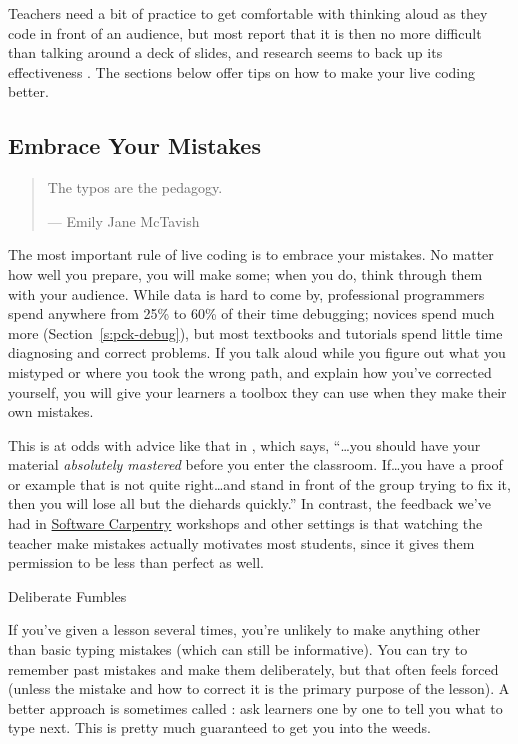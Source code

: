 Teachers need a bit of practice to get comfortable with thinking aloud
as they code in front of an audience, but most report that it is then no
more difficult than talking around a deck of slides, and research seems
to back up its effectiveness \cite{Rubi2013,Haar2017}. The sections
below offer tips on how to make your live coding better.

\subsection*{Embrace Your Mistakes}

\begin{quote}
The typos are the pedagogy.

--- Emily Jane McTavish
\end{quote}

The most important rule of live coding is to embrace your mistakes. No
matter how well you prepare, you will make some; when you do, think
through them with your audience. While data is hard to come by,
professional programmers spend anywhere from 25\% to 60\% of their time
debugging; novices spend much more (Section~\ref{s:pck-debug}), but most
textbooks and tutorials spend little time diagnosing and correct
problems. If you talk aloud while you figure out what you mistyped or
where you took the wrong path, and explain how you've corrected
yourself, you will give your learners a toolbox they can use when they
make their own mistakes.

This is at odds with advice like that in \cite{Kran2015}, which
says, ``\ldots{}you should have your material \emph{absolutely mastered} before
you enter the classroom. If\ldots{}you have a proof or example that is not
quite right\ldots{}and stand in front of the group trying to fix it, then
you will lose all but the diehards quickly.'' In contrast, the feedback
we've had in \href{http://software-carpentry.org}{Software Carpentry} workshops and other settings is
that watching the teacher make mistakes actually motivates most
students, since it gives them permission to be less than perfect as
well.

\begin{aside}{Deliberate Fumbles}

If you've given a lesson several times, you're unlikely to make
anything other than basic typing mistakes (which can still be
informative). You can try to remember past mistakes and make them
deliberately, but that often feels forced (unless the mistake and
how to correct it is the primary purpose of the lesson). A better
approach is sometimes called : ask
learners one by one to tell you what to type next. This is pretty
much guaranteed to get you into the weeds.

\end{aside}

